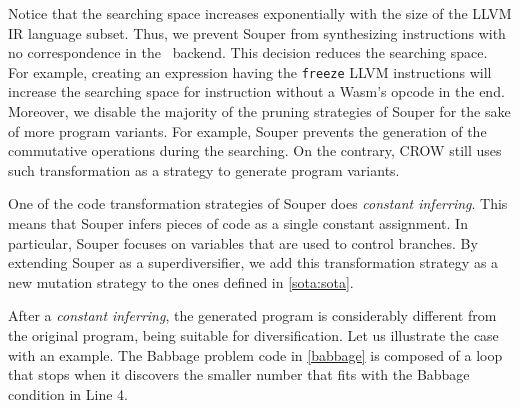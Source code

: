 Notice that the searching space increases exponentially with the size of the LLVM IR language subset. Thus,
we prevent Souper from synthesizing instructions with no correspondence in the \wasm\ backend. This decision reduces the searching space. For example, creating an expression having the  \texttt{freeze} LLVM instructions will increase the searching space for instruction without a Wasm's opcode in the end.
Moreover, we disable the majority of the pruning strategies of Souper for the sake of more program variants.
For example, Souper prevents the generation of the commutative operations during the searching.
On the contrary, CROW still uses such transformation as a strategy to generate program variants. 


One of the code transformation strategies of Souper does \emph{constant inferring}. This means that Souper infers pieces of code as a single constant assignment. In particular, Souper focuses on variables that are used to control branches.
By extending Souper as a superdiversifier, we add this transformation strategy as a new mutation strategy to the ones defined in \autoref{sota:sota}. 


After a \emph{constant inferring}, the generated program is considerably different from the original program, being suitable for diversification.
Let us illustrate the case with an example.
The Babbage problem code in \autoref{babbage} is composed of a loop that stops when it discovers the smaller number that fits with the Babbage condition in Line 4.


